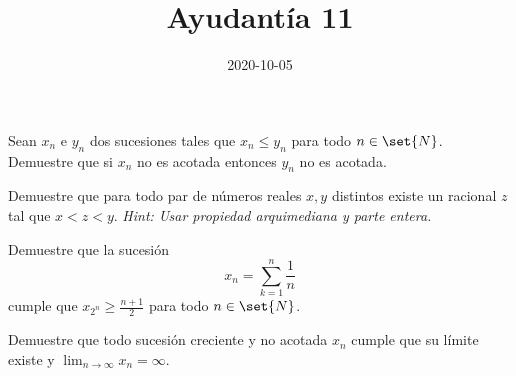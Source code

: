 \documentclass{ayudantia}
\title{Ayudantía 11}
\date{2020-10-05}
\begin{document}
\maketitle

\begin{prob}
    Sean \(x_n\) e \(y_n\) dos sucesiones tales que \(x_n\leq y_n\) para todo \(n\in\set{N}\). Demuestre que si \(x_n\) no es acotada entonces \(y_n\) no es acotada.
\end{prob}

\begin{ans}
    \begin{sol}

    \end{sol}
\end{ans}


\begin{prob}
    Demuestre que para todo par de números reales \(x,y\) distintos existe un racional \(z\) tal que \(x<z<y\).
    \textit{Hint: Usar propiedad arquimediana y parte entera.}
\end{prob}

\begin{ans}
    \begin{sol}

    \end{sol}
\end{ans}


\begin{prob}
    Demuestre que la sucesión
    \begin{equation*}
        x_n=\sum_{k=1}^n\frac1n
    \end{equation*}
    cumple que \(x_{2^n}\geq\frac{n+1}2\) para todo \(n\in\set{N}\).
\end{prob}

\begin{ans}
    \begin{sol}

    \end{sol}
\end{ans}


\begin{prob}
    Demuestre que todo sucesión creciente y no acotada \(x_n\) cumple que su límite existe y \(\lim_{n\rightarrow\infty}x_n=\infty\).
\end{prob}

\begin{ans}
    \begin{sol}

    \end{sol}
\end{ans}
\end{document}
